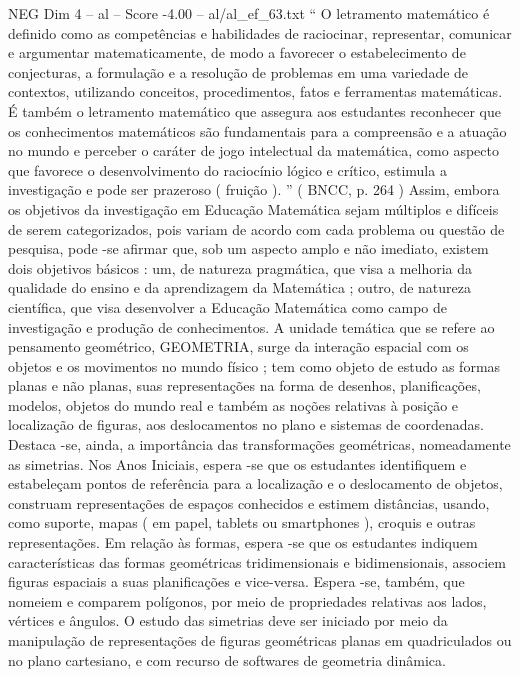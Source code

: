 \begin{textsample}{NEG Dim 4 – al – Score -4.00 – al/al\_ef\_63.txt}  \label{ex:f4_neg_241}
“ O letramento matemático é definido como as competências e habilidades de raciocinar, representar, comunicar e argumentar matematicamente, de modo a favorecer o estabelecimento de conjecturas, a formulação e a resolução de problemas em uma variedade de contextos, utilizando conceitos, procedimentos, fatos e ferramentas matemáticas.
É também o letramento matemático que assegura aos estudantes reconhecer que os conhecimentos matemáticos são fundamentais para a compreensão e a atuação no mundo e perceber o caráter de jogo intelectual da matemática, como aspecto que favorece o desenvolvimento do raciocínio lógico e crítico, estimula a investigação e pode ser prazeroso ( fruição ). ” ( BNCC, p. 264 ) Assim, embora os objetivos da investigação em Educação Matemática sejam múltiplos e difíceis de serem categorizados, pois variam de acordo com cada problema ou questão de pesquisa, pode -se afirmar que, sob um aspecto amplo e não imediato, existem dois objetivos básicos : um, de natureza pragmática, que visa a melhoria da qualidade do ensino e da aprendizagem da Matemática ; outro, de natureza científica, que visa desenvolver a Educação Matemática como campo de investigação e produção de conhecimentos.
A unidade temática que se refere ao pensamento geométrico, GEOMETRIA, surge da interação espacial com os objetos e os movimentos no mundo físico ; tem como objeto de estudo as formas planas e não planas, suas representações na forma de desenhos, planificações, modelos, objetos do mundo real e também as noções relativas à posição e localização de figuras, aos deslocamentos no plano e sistemas de coordenadas.
Destaca -se, ainda, a importância das transformações geométricas, nomeadamente as simetrias.
Nos Anos Iniciais, espera -se que os estudantes identifiquem e estabeleçam pontos de referência para a localização e o deslocamento de objetos, construam representações de espaços conhecidos e estimem distâncias, usando, como suporte, mapas ( em papel, tablets ou smartphones ), croquis e outras representações.
Em relação às formas, espera -se que os estudantes indiquem características das formas geométricas tridimensionais e bidimensionais, associem figuras espaciais a suas planificações e vice-versa.
Espera -se, também, que nomeiem e comparem polígonos, por meio de propriedades relativas aos lados, vértices e ângulos.
O estudo das simetrias deve ser iniciado por meio da manipulação de representações de figuras geométricas planas em quadriculados ou no plano cartesiano, e com recurso de softwares de geometria dinâmica.

\end{textsample}
